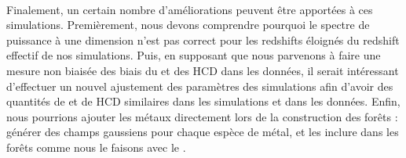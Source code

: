 \paragraph{}
Finalement, un certain nombre d'améliorations peuvent être apportées à ces simulations. Premièrement, nous devons comprendre pourquoi le spectre de puissance à une dimension n'est pas correct pour les redshifts éloignés du redshift effectif de nos simulations.
Puis, en supposant que nous parvenons à faire une mesure non biaisée des biais du \lya{} et des HCD dans les données, il serait intéressant d'effectuer un nouvel ajustement des paramètres des simulations afin d'avoir des quantités de \lya{} et de HCD similaires dans les simulations et dans les données.
Enfin, nous pourrions ajouter les métaux directement lors de la construction des forêts \lya{} : générer des champs gaussiens pour chaque espèce de métal, et les inclure dans les forêts comme nous le faisons avec le \lya{}.
